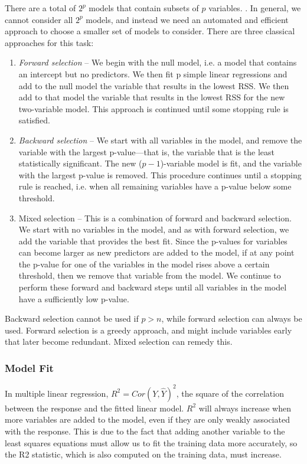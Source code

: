 \documentclass{article}
\begin{document}
There are a total of $2^p$ models that contain subsets of $p$ variables. . In general, we cannot consider all $2^p$ models, and instead we need an automated and efficient approach to choose a smaller set of models to consider. There
are three classical approaches for this task:
\begin{enumerate}
    \item \textit{Forward selection} -- We begin with the null model, i.e. a model that contains an intercept but no predictors. We then fit p simple linear regressions and add to the null model the variable that results in the lowest RSS. We then add to that model the variable that results in the lowest RSS for the new two-variable model. This approach is continued until some stopping rule is satisfied.
    
    \item \textit{Backward selection} -- We start with all variables in the model, and remove the variable with the largest p-value—that is, the variable  that is the least statistically significant. The new ($p - 1$)-variable model is fit, and the variable with the largest p-value is removed. This procedure continues until a stopping rule is reached, i.e. when  all remaining variables have a p-value below some threshold.
    
    \item Mixed selection -- This is a combination of forward and backward selection. We start with no variables in the model, and as with forward selection, we add the variable that provides the best fit. Since the p-values for variables can become larger as new predictors are added to the model, if at any point the p-value for one of the variables in the model rises above a certain threshold, then we remove that variable from the model. We continue to perform these forward and backward steps until all variables in the model have a sufficiently low p-value.
\end{enumerate}

Backward selection cannot be used if $p>n$, while forward selection can
always be used. Forward selection is a greedy approach, and might include
variables early that later become redundant. Mixed selection can remedy
this.

\subsubsection*{Model Fit}
In multiple linear regression, $R^2 =  Cor(Y, \hat Y)^2$,  the square of the correlation between the response and the fitted linear model. $R^2$ will always increase when more variables are added to the model, even if they are only weakly associated with the response.  This is due to the fact that adding another variable to the least squares equations must allow us to fit the training data more accurately, so the R2 statistic, which is also computed on the training data, must increase.
\end{document}
